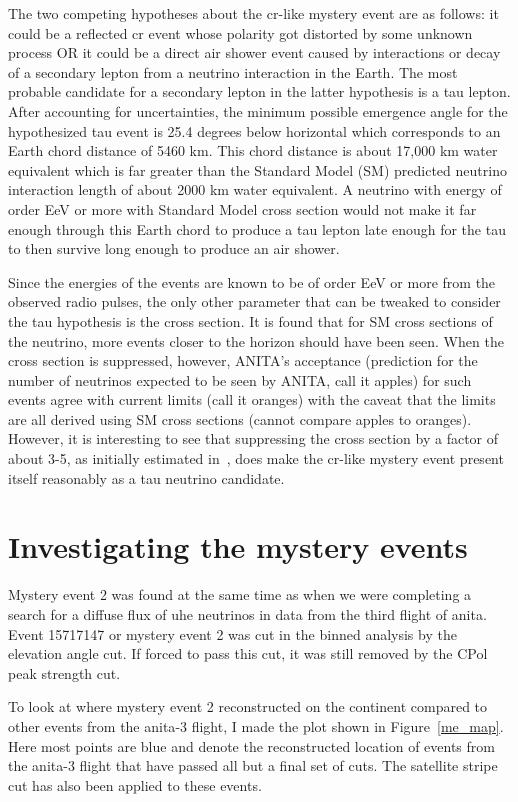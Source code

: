 The two competing hypotheses about the \gls{cr}-like mystery event are as follows: it could be a reflected \gls{cr} event whose polarity got distorted by some unknown process OR it could be a direct air shower event caused by interactions or decay of a secondary lepton from a neutrino interaction in the Earth. The most probable candidate for a secondary lepton in the latter hypothesis is a tau lepton. After accounting for uncertainties, the minimum possible emergence angle for the hypothesized tau event is 25.4 degrees below horizontal which corresponds to an Earth chord distance of 5460 km. This chord distance is about 17,000 km water equivalent which is far greater than the Standard Model (SM) predicted neutrino interaction length of about 2000 km water equivalent. A neutrino with energy of order EeV or more with Standard Model cross section would not make it far enough through this Earth chord to produce a tau lepton late enough for the tau to then survive long enough to produce an air shower. 

Since the energies of the events are known to be of order EeV or more from the observed radio pulses, the only other parameter that can be tweaked to consider the tau hypothesis is the cross section. It is found that for SM cross sections of the neutrino, more events closer to the horizon should have been seen. When the cross section is suppressed, however, ANITA’s acceptance (prediction for the number of neutrinos expected to be seen by ANITA, call it apples) for such events agree with current limits (call it oranges) with the caveat that the limits are all derived using SM cross sections (cannot compare apples to oranges). However, it is interesting to see that suppressing the cross section by a factor of about 3-5, as initially estimated in~\cite{me1},
does make the \gls{cr}-like mystery event present itself reasonably as a tau neutrino candidate. 


\section{Investigating the mystery events}

Mystery event 2 was found at the same time as when we were completing a search for a diffuse flux of \gls{uhe} neutrinos in data from the third flight of \gls{anita}. Event 15717147 or mystery event 2 was cut in the binned analysis by the elevation angle cut. If forced to pass this cut, it was still removed by the CPol peak strength cut. 

To look at where mystery event 2 reconstructed on the continent compared to other events from the \gls{anita}-3 flight, I made the plot shown in Figure~\ref{me_map}. Here most points are blue and denote the reconstructed location of events from the \gls{anita}-3 flight that have passed all but a final set of cuts. The satellite stripe cut has also been applied to these events. 

